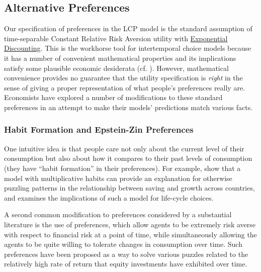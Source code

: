 \documentclass{article}
\begin{document}
\subsection{Alternative Preferences}

Our specification of preferences in the LCP model is the standard assumption of time-separable Constant Relative Risk Aversion utility with \href{https://en.wikipedia.org/wiki/Exponential\_discounting}{Exponential Discounting}.
This is the workhorse tool for intertemporal choice models because it has a number of convenient mathematical properties and its implications satisfy some plausible economic desiderata (cf. \cite{kimballStandardRA}).
However, mathematical convenience provides no guarantee that the utility specification is \textit{right} in the sense of giving a proper representation of what people's preferences really are.
Economists have explored a number of modifications to these standard preferences in an attempt to make their models' predictions match various facts.

\subsubsection{Habit Formation and Epstein-Zin Preferences}

One intuitive idea is that people care not only about the current level of their consumption but also about how it compares to their past levels of consumption (they have ``habit formation'' in their preferences).
For example, \cite{Carroll_2000} show that a model with multiplicative habits can provide an explanation for otherwise puzzling patterns in the relationship between saving and growth across countries, and
\cite{Michaelides_2002} examines the implications of such a model for life-cycle choices.

A second common modification to preferences considered by a substantial literature is the use of \cite{Epstein_1991} preferences, which allow agents to be extremely risk averse with respect to financial risk at a point of time, while simultaneously allowing the agents to be quite willing to tolerate changes in consumption over time.
Such preferences have been proposed as a way to solve various puzzles related to the relatively high rate of return that equity investments have exhibited over time.
\end{document}
